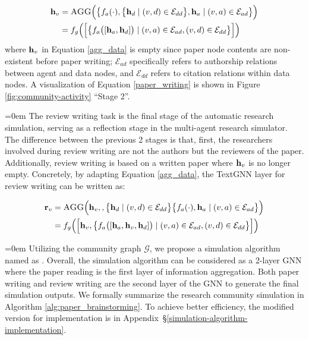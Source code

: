 \vspace{-5mm}
\begingroup
\small
\begin{equation}
\begin{aligned}
    \mathbf{h}_{v} &= \textsc{AGG}\Big( 
        \big\{f_a(\cdot), \big\{\mathbf{h}_d \mid (v,d) \in \mathcal{E}_{dd}\big\}, \mathbf{h}_a \mid (v,a) \in \mathcal{E}_{ad}\big\}
    \Big) \\
    &= f_g\Big(
        \Big[
            \big\{f_a\big([\mathbf{h}_a, \mathbf{h}_d]\big) \mid (v,a) \in \mathcal{E}_{ad}, 
            (v,d) \in \mathcal{E}_{dd}\big\}
        \Big]
    \Big)
\end{aligned}
\label{paper_writing}
\end{equation}
\endgroup
where $\mathbf{h}_v$ in Equation \ref{agg_data} is empty since paper node contents are non-existent before paper writing; $\mathcal{E}_{ad}$ specifically refers to authorship relations between agent and data nodes, and $\mathcal{E}_{dd}$ refers to citation relations within data nodes. A visualization of Equation \ref{paper_writing} is shown in Figure \ref{fig:community-activity} ``Stage 2''.



\hangindent=0em
 The review writing task is the final stage of the automatic research simulation, serving as a reflection stage in the multi-agent research simulator. The difference between the previous 2 stages is that, first, the researchers involved during review writing are not the authors but the reviewers of the paper. Additionally, review writing is based on a written paper where $\mathbf{h}_v$ is no longer empty. Concretely, by adapting Equation \ref{agg_data}, the TextGNN layer for review writing can be written as:

\vspace{-5mm}
\begingroup
\small
\begin{equation}
\begin{aligned}
    \mathbf{r}_{v} &= \textsc{AGG}\Big(\mathbf{h}_v, 
    , \big\{\mathbf{h}_d \mid (v,d) \in \mathcal{E}_{dd}\big\}\big\{f_a(\cdot), \mathbf{h}_a \mid (v,a) \in \mathcal{E}_{ad}\big\}\Big) \\
    &= f_g\Big(\Big[\mathbf{h}_v, 
    \big\{f_a\big([\mathbf{h}_a, \mathbf{h}_v, \mathbf{h}_d]\big) \mid  (v,a) \in \mathcal{E}_{ad}, (v,d) \in \mathcal{E}_{dd}\big\}\Big]\Big)
\end{aligned}
\label{review_writing}
\end{equation}
\endgroup

\hangindent=0em
 Utilizing the community graph $\mathcal{G}$, we propose a simulation algorithm named as \envname. Overall, the simulation algorithm can be considered as a 2-layer GNN where the paper reading is the first layer of information aggregation. Both paper writing and review writing are the second layer of the GNN to generate the final simulation outputs. We formally summarize the research community simulation in Algorithm \ref{alg:paper_brainstorming}. To achieve better efficiency, the modified version for implementation is in Appendix~\S\ref{simulation-algorithm-implementation}.

